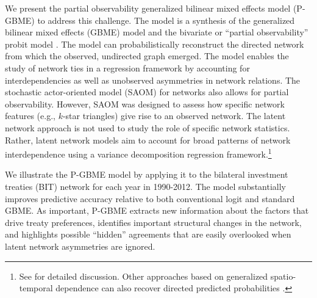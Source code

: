 
We present the partial observability generalized bilinear mixed effects model (P-GBME) to address this challenge.  The model is a synthesis of the generalized bilinear mixed effects (GBME) model \citep{hoff:2005} and the bivariate or ``partial observability'' probit model \citep{poirier:1980, przeworski:vreel:2002}. The model can probabilistically reconstruct the directed network from which the observed, undirected graph emerged. The model enables the study of network ties in a regression framework by accounting for interdependencies as well as unobserved asymmetries in network relations. The stochastic actor-oriented model (SAOM) for networks \citep{snijders:pickup:2017, stadtfeld:etal:2017} also allows for partial observability. However, SAOM was designed to assess how specific network features (e.g., $k$-star triangles) give rise to an observed network. The latent network approach is not used to study the role of specific network statistics.  Rather, latent network models aim to account for broad patterns of network interdependence using a variance decomposition regression framework.\footnote{See \citet{minhas:etal:2016:arxiv} for detailed discussion. Other approaches based on generalized spatio-temporal dependence can also recover directed predicted probabilities \citet{franzese:etal:2012}.}

We illustrate the P-GBME model by applying it to the bilateral investment treaties (BIT) network for each year in 1990-2012. The model substantially improves predictive accuracy relative to both conventional logit and standard GBME. As important, P-GBME extracts new information about the factors that drive treaty preferences, identifies important structural changes in the network, and highlights possible ``hidden'' agreements that are easily overlooked when latent network asymmetries are ignored.
